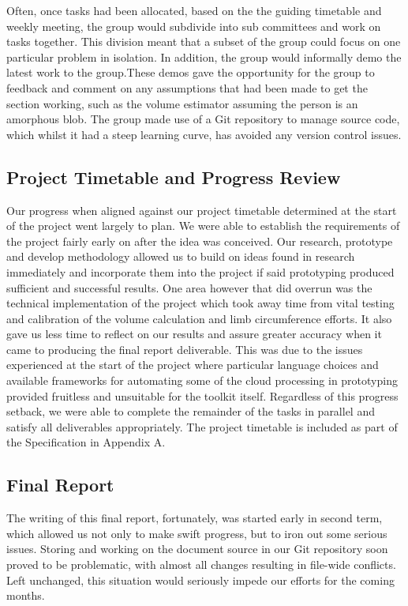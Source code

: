
Often, once tasks had been allocated, based on the the guiding timetable and weekly meeting, the group would subdivide into sub committees and work on tasks together. This division meant that a subset of the group could focus on one particular problem in isolation. In addition, the group would informally demo the latest work to the group.These demos gave the opportunity for the group to feedback and comment on any assumptions that had been made to get the section working, such as the volume estimator assuming the person is an amorphous blob. The group made use of a Git repository \cite{githole} to manage source code, which whilst it had a steep learning curve, has avoided any version control issues. \\

\subsection{Project Timetable and Progress Review}

Our progress when aligned against our project timetable determined at the start of the project went largely to plan. We were able to establish the requirements of the project fairly early on after the idea was conceived. Our research, prototype and develop methodology allowed us to build on ideas found in research immediately and incorporate them into the project if said prototyping produced sufficient and successful results. One area however that did overrun was the technical implementation of the project which took away time from vital testing and calibration of the volume calculation and limb circumference efforts. It also gave us less time to reflect on our results and assure greater accuracy when it came to producing the final report deliverable. This was due to the issues experienced at the start of the project where particular language choices and available frameworks for automating some of the cloud processing in prototyping provided fruitless and unsuitable for the toolkit itself. Regardless of this progress setback, we were able to complete the remainder of the tasks in parallel and satisfy all deliverables appropriately. The project timetable is included as part of the Specification in Appendix A.

\subsection{Final Report}
The writing of this final report, fortunately, was started early in second term, which allowed us not only to make swift progress, but to iron out some serious issues. Storing and working on the document source in our Git repository soon proved to be problematic, with almost all changes resulting in file-wide conflicts. Left unchanged, this situation would seriously impede our efforts for the coming months.\\

